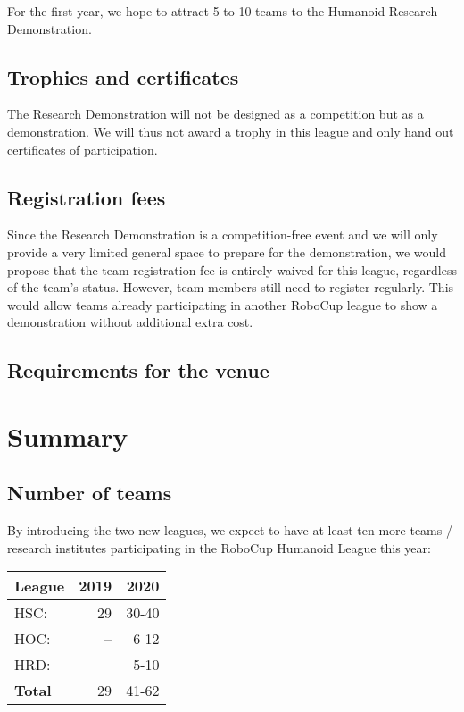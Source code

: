 \documentclass{article}
\begin{document}
For the first year, we hope to attract 5 to 10 teams to the Humanoid Research Demonstration.

\subsection{Trophies and certificates}
The Research Demonstration will not be designed as a competition but as a demonstration. We will thus not award a trophy in this league and only hand out certificates of participation. 

\subsection{Registration fees}

Since the Research Demonstration is a competition-free event and we will only provide a very limited general space to prepare for the demonstration, we would propose that the team registration fee is entirely waived for this league, regardless of the team's status. However, team members still need to register regularly. This would allow teams already participating in another RoboCup league to show a demonstration without additional extra cost. 

\subsection{Requirements for the venue}
 
\section{Summary}

\subsection{Number of teams}
By introducing the two new leagues, we expect to have at least ten more teams / research institutes participating in the RoboCup Humanoid League this year:

\begin{table}[h]
  \centering
  \begin{tabular}{l | r | r}
    League & 2019 & 2020\\
    \hline
    HSC: & 29 & 30-40\\ 
    HOC: & -- & 6-12\\
    HRD: & -- & 5-10\\
    \hline
    \textbf{Total} & 29 & 41-62
  \end{tabular}
\end{table}
\end{document}
